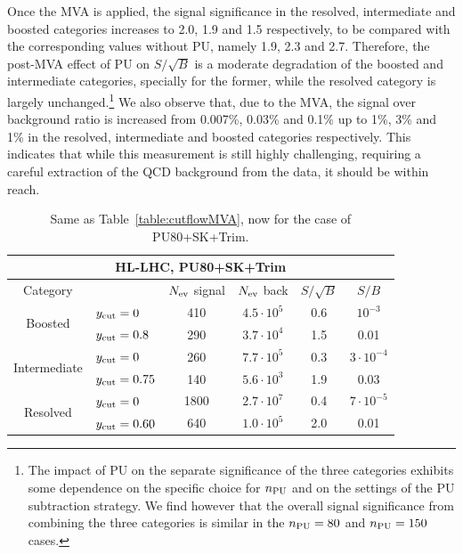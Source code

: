 Once the MVA is applied, the signal significance in the 
resolved, intermediate and boosted
categories increases to 2.0, 1.9 and 1.5 respectively,
to be compared with the corresponding values
without PU, namely 1.9, 2.3 and 2.7.
%
Therefore, the post-MVA effect of PU on $S/\sqrt{B}$ is
a moderate degradation of the boosted and intermediate categories,
specially for the former,
while the resolved category is largely unchanged.\footnote{
  The impact of PU on the  separate significance of
  the three categories exhibits some
  dependence on the specific choice for $n_{\rm PU}$  and on the settings
  of the PU subtraction strategy.
  We find however that the
  overall signal significance from combining the three
  categories is similar in the $n_{\rm PU}=80$ and
  $n_{\rm PU}=150$ cases.
}
%
We also observe that, due
to the MVA, the
signal over background ratio is increased from 0.007\%, 0.03\% and
0.1\% up to 1\%, 3\% and 1\% in the resolved, intermediate
and boosted categories respectively.
%
This indicates that while this measurement is still highly challenging,
requiring a careful extraction of the QCD
background from the data, it should be within reach.

\begin{table}[t]
  \centering
  \begin{tabular}{|c|l|c|c|c|c|}
        \hline
     \multicolumn{6}{|c|}{HL-LHC, PU80+SK+Trim} \\
     \hline
         \hline
    Category  &   &  $N_{\rm ev}$ signal &  $N_{\rm ev}$ back  &  $S/\sqrt{B}$ & $S/B$ \\ 
    \hline
    \hline
    \multirow{2}{*}{Boosted} &  $y_{\rm cut}=0$  & 410   &  $4.5\cdot 10^5$ & 0.6   & $ 10^{-3}$  \\
    &  $y_{\rm cut}=0.8$ &  290  & $3.7\cdot 10^4$  & 1.5    & 0.01  \\
    \hline
    \hline
    \multirow{2}{*}{Intermediate} &  $y_{\rm cut}=0$  &  260  & $7.7\cdot 10^5$    & 0.3    &
     $3\cdot 10^{-4}$ \\
    &  $y_{\rm cut}=0.75$ & 140 & $5.6\cdot 10^3$  &  1.9   & 0.03 \\
    \hline
    \hline
    \multirow{2}{*}{Resolved} &  $y_{\rm cut}=0$  &  1800  & $2.7\cdot 10^7$
    & 0.4    &  $7\cdot 10^{-5}$  \\
    &  $y_{\rm cut}=0.60$ & 640  & $1.0\cdot 10^5$  &  2.0   & 0.01  \\
    \hline
      \end{tabular}
  \caption{\small Same as Table~\ref{table:cutflowMVA}, now for the case
    of PU80+SK+Trim.
        \label{table:cutflowMVA_PU}
  }
\end{table}

